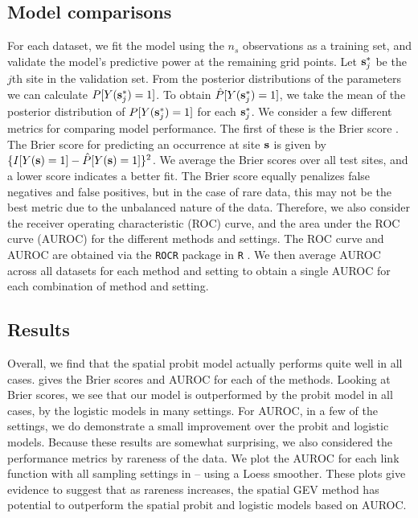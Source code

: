 \documentclass[12pt]{article}
\begin{document}
\subsection{Model comparisons}\label{rbs:cv}

For each dataset, we fit the model using the $n_s$ observations as a training set, and validate the model's predictive power at the remaining grid points.
Let $\mathbf{s}^*_j$ be the $j$th site in the validation set.
From the posterior distributions of the parameters we can calculate $P[Y(\mathbf{s}^*_j) = 1]$.
To obtain $\hat{P}[Y(\mathbf{s}^*_j) = 1]$, we take the mean of the posterior distribution of $P[Y(\mathbf{s}^*_j) = 1]$ for each $\mathbf{s}^*_j$.
We consider a few different metrics for comparing model performance.
The first of these is the Brier score \citep[BS]{Gneiting2007}.
The Brier score for predicting an occurrence at site $\mathbf{s}$ is given by $\{I[Y(\mathbf{s})=1] - \hat{P}[Y(\mathbf{s})=1]\}^2$.
We average the Brier scores over all test sites, and a lower score indicates a better fit.
The Brier score equally penalizes false negatives and false positives, but in the case of rare data, this may not be the best metric due to the unbalanced nature of the data.
Therefore, we also consider the receiver operating characteristic (ROC) curve, and the area under the ROC curve (AUROC) for the different methods and settings.
The ROC curve and AUROC are obtained via the \texttt{ROCR} \citep{Sing2005} package in \texttt{R} \citep{Rmanual}.
We then average AUROC across all datasets for each method and setting to obtain a single AUROC for each combination of method and setting.

\subsection{Results} \label{rbs:simresults}

Overall, we find that the spatial probit model actually performs quite well in all cases.
 gives the Brier scores and AUROC for each of the methods.
Looking at Brier scores, we see that our model is outperformed by the probit model in all cases, by the logistic models in many settings.
For AUROC, in a few of the settings, we do demonstrate a small improvement over the probit and logistic models.
Because these results are somewhat surprising, we also considered the performance metrics by rareness of the data.
We plot the AUROC for each link function with all sampling settings in  --  using a Loess smoother.
These plots give evidence to suggest that as rareness increases, the spatial GEV method has potential to outperform the spatial probit and logistic models based on AUROC.
\end{document}
